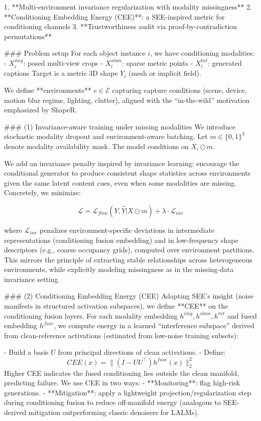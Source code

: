 1. **Multi-environment invariance regularization with modality missingness**  
2. **Conditioning Embedding Energy (CEE)**: a SEE-inspired metric for conditioning channels  
3. **Trustworthiness audit via proof-by-contradiction permutations**

### Problem setup  
For each object instance \(i\), we have conditioning modalities:  
- \(X^{img}_i\): posed multi-view crops  
- \(X^{slam}_i\): sparse metric points  
- \(X^{txt}_i\): generated captions  
Target is a metric 3D shape \(Y_i\) (mesh or implicit field).

We define **environments** \(e \in \mathcal{E}\) capturing capture conditions (scene, device, motion blur regime, lighting, clutter), aligned with the “in-the-wild” motivation emphasized by ShapeR.

### (1) Invariance-aware training under missing modalities  
We introduce stochastic modality dropout and environment-aware batching. Let \(m \in \{0,1\}^3\) denote modality availability mask. The model conditions on \(X_i \odot m\).

We add an invariance penalty inspired by invariance learning: encourage the conditional generator to produce consistent shape statistics across environments given the same latent content cues, even when some modalities are missing. Concretely, we minimize:

\[
\mathcal{L} = \mathcal{L}_{flow}(Y, \hat{Y}|X\odot m) + \lambda \cdot \mathcal{L}_{inv}
\]

where \(\mathcal{L}_{inv}\) penalizes environment-specific deviations in intermediate representations (conditioning fusion embedding) and in low-frequency shape descriptors (e.g., coarse occupancy grids), computed over environment partitions. This mirrors the principle of extracting stable relationships across heterogeneous environments, while explicitly modeling missingness as in the missing-data invariance setting.

### (2) Conditioning Embedding Energy (CEE)  
Adapting SEE’s insight (noise manifests in structured activation subspaces), we define **CEE** on the conditioning fusion layers. For each modality embedding \(h^{img}, h^{slam}, h^{txt}\) and fused embedding \(h^{fuse}\), we compute energy in a learned “interference subspace” derived from clean-reference activations (estimated from low-noise training subsets):

- Build a basis \(U\) from principal directions of clean activations.  
- Define:
\[
CEE(x) = \| (I - UU^\top) h^{fuse}(x) \|_2^2
\]
Higher CEE indicates the fused conditioning lies outside the clean manifold, predicting failure. We use CEE in two ways:
- **Monitoring**: flag high-risk generations.  
- **Mitigation**: apply a lightweight projection/regularization step during conditioning fusion to reduce off-manifold energy (analogous to SEE-derived mitigation outperforming classic denoisers for LALMs).

